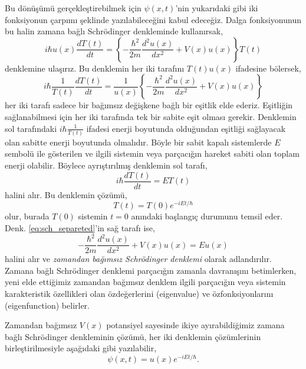 \documentclass[00_kitap.tex]{subfiles}
\begin{document}
Bu dönüşümü gerçekleştirebilmek için $\psi ( x , t )$'nin yukarıdaki gibi iki fonksiyonun çarpımı şeklinde yazılabileceğini kabul edeceğiz. Dalga fonksiyonunun bu halin zamana bağlı Schrödinger denkleminde kullanırsak,
\begin{equation*}
i \hbar u ( x ) \frac { d T ( t ) } { d t } = \left\{ - \frac { \hbar ^ { 2 } } { 2 m } \frac { d ^ { 2 } u ( x ) } { d x ^ { 2 } } + V ( x ) u ( x ) \right\} T ( t )
\end{equation*}
denklemine ulaşırız. Bu denklemin her iki tarafını $T ( t ) u ( x )$ ifadesine bölersek,
\begin{equation}
i \hbar \frac { 1 } { T ( t ) } \frac { d T ( t ) } { d t } = \frac { 1 } { u ( x ) } \left\{ - \frac { \hbar ^ { 2 } } { 2 m } \frac { d ^ { 2 } u ( x ) } { d x ^ { 2 } } + V ( x ) u ( x ) \right\}
\label{eq:sch_separeted}
\end{equation}
her iki tarafı sadece bir bağımsız değişkene bağlı bir eşitlik elde ederiz. Eşitliğin sağlanabilmesi için her iki tarafında tek bir sabite eşit olması gerekir. Denklemin sol tarafındaki $i \hbar \frac { 1 } { T ( t ) }$ ifadesi enerji boyutunda olduğundan eşitliği sağlayacak olan sabitte enerji boyutunda olmalıdır. Böyle bir sabit kapalı sistemlerde $E$ sembolü ile gösterilen ve ilgili sistemin veya parçacığın hareket sabiti olan toplam enerji olabilir. Böylece ayrıştırılmış denklemin sol tarafı,
\begin{equation}
i \hbar \frac { d T ( t ) } { d t } = E T ( t )
\end{equation}
halini alır. Bu denklemin çözümü,
\begin{equation}
T ( t ) = T(0) e ^ { - i E t / \hbar }
\end{equation}
olur, burada $T(0)$ sistemin $t=0$ anındaki başlangıç durumunu temsil eder. Denk. \ref{eq:sch_separeted}'in sağ tarafı ise,
\begin{equation}
- \frac { \hbar ^ { 2 } } { 2 m } \frac { d ^ { 2 } u ( x ) } { d x ^ { 2 } } + V ( x ) u ( x ) = E u ( x )
\label{eq:time_independent_sch_eq}
\end{equation}
halini alır ve \emph{zamandan bağımsız Schrödinger denklemi} olarak adlandırılır. Zamana bağlı Schrödinger denklemi parçacığın zamanla davranışını betimlerken, yeni elde ettiğimiz zamandan bağımsız denklem ilgili parçacığın veya sistemin karakteristik özellikleri olan özdeğerlerini (eigenvalue) ve özfonksiyonlarını (eigenfunction) belirler.

Zamandan bağımsız $V(x)$ potansiyel sayesinde ikiye ayırabildiğimiz zamana bağlı Schrödinger denkleminin çözümü, her iki denklemin çözümlerinin birleştirilmesiyle aşağıdaki gibi yazılabilir,
\begin{equation}
\psi(x,t) = u(x) e ^ { - i E t / \hbar }.
\end{equation}
\end{document}
